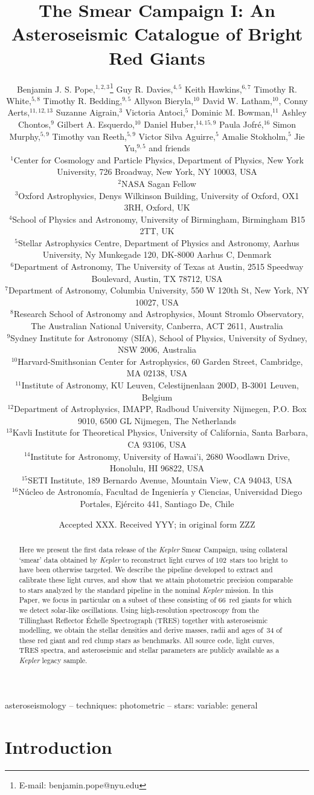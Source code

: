 \documentclass[a4paper,fleqn,usenatbib]{mnras}
\title[The Kepler Smear Campaign]{The \kepler Smear Campaign I: An Asteroseismic Catalogue of Bright Red Giants}
\author[B. J. S. Pope et al.]{Benjamin J. S. Pope,$^{1,2,3}$\thanks{E-mail: benjamin.pope@nyu.edu}
Guy R. Davies,$^{4,5}$
Keith Hawkins,$^{6,7}$
Timothy R. White,$^{5,8}$\newauthor
Timothy R. Bedding,$^{9,5}$
Allyson Bieryla,$^{10}$
David W. Latham,$^{10}$,
Conny Aerts,$^{11,12,13}$\newauthor
Suzanne Aigrain,$^{3}$ 
Victoria Antoci,$^{5}$
Dominic M. Bowman,$^{11}$
Ashley Chontos,$^{9}$\newauthor
Gilbert A. Esquerdo,$^{10}$
Daniel Huber,$^{14,15,9}$
Paula Jofr\'{e},$^{16}$
Simon Murphy,$^{5,9}$\newauthor
Timothy van Reeth,$^{5,9}$
Victor Silva Aguirre,$^{5}$
Amalie Stokholm,$^{5}$
Jie Yu,$^{9,5}$ \newauthor
and friends
\\
$^{1}$Center for Cosmology and Particle Physics, Department of Physics, New York University, 726 Broadway, New York, NY 10003, USA\\
$^{2}$NASA Sagan Fellow\\
$^{3}$Oxford Astrophysics, Denys Wilkinson Building, University of Oxford, OX1 3RH, Oxford, UK\\
$^{4}$School of Physics and Astronomy, University of Birmingham, Birmingham B15 2TT, UK\\
$^{5}$Stellar Astrophysics Centre, Department of Physics and Astronomy, Aarhus University, Ny Munkegade 120, DK-8000 Aarhus C, Denmark\\
$^{6}$Department of Astronomy, The University of Texas at Austin, 2515 Speedway Boulevard, Austin, TX 78712, USA\\
$^{7}$Department of Astronomy, Columbia University, 550 W 120th St, New York, NY 10027, USA\\
$^{8}$Research School of Astronomy and Astrophysics, Mount Stromlo Observatory, The Australian National University, Canberra, ACT 2611, Australia\\
$^{9}$Sydney Institute for Astronomy (SIfA), School of Physics, University of Sydney, NSW 2006, Australia\\
$^{10}$Harvard-Smithsonian Center for Astrophysics, 60 Garden Street, Cambridge, MA 02138, USA\\
$^{11}$Institute of Astronomy, KU Leuven, Celestijnenlaan 200D, B-3001 Leuven, Belgium\\
$^{12}$Department of Astrophysics, IMAPP, Radboud University Nijmegen, P.O. Box 9010, 6500 GL Nijmegen, The Netherlands\\
$^{13}$Kavli Institute for Theoretical Physics, University of California, Santa Barbara, CA 93106, USA\\
$^{14}$Institute for Astronomy, University of Hawai'i, 2680 Woodlawn Drive, Honolulu, HI 96822, USA\\
$^{15}$SETI Institute, 189 Bernardo Avenue, Mountain View, CA 94043, USA\\
$^{16}$N\'{u}cleo de Astronom\'{i}a, Facultad de Ingenier\'{i}a y Ciencias, Universidad Diego Portales, Ej\'{e}rcito 441, Santiago De, Chile\\
}
\date{Accepted XXX. Received YYY; in original form ZZZ}
\newcommand{\kepler}{\emph{Kepler}\xspace}
\begin{document}
\label{firstpage}
\pagerange{\pageref{firstpage}--\pageref{lastpage}}
\maketitle

\begin{abstract}
Here we present the first data release of the \kepler Smear Campaign, using collateral `smear' data obtained by \kepler to reconstruct light curves of 102~stars too bright to have been otherwise targeted. We describe the pipeline developed to extract and calibrate these light curves, and show that we attain photometric precision comparable to stars analyzed by the standard pipeline in the nominal \kepler mission. In this Paper, we focus in particular on a subset of these consisting of 66~red giants for which we detect solar-like oscillations. Using high-resolution spectroscopy from the Tillinghast Reflector \'{E}chelle Spectrograph (TRES) together with asteroseismic modelling, we obtain the stellar densities and derive masses, radii and ages of~34 of these red giant and red clump stars as benchmarks. All source code, light curves, TRES spectra, and asteroseismic and stellar parameters are publicly available as a \kepler legacy sample.
\end{abstract}

\begin{keywords}
asteroseismology -- techniques: photometric -- stars: variable: general
\end{keywords}



\section{Introduction}
\label{intro}

\end{document}
